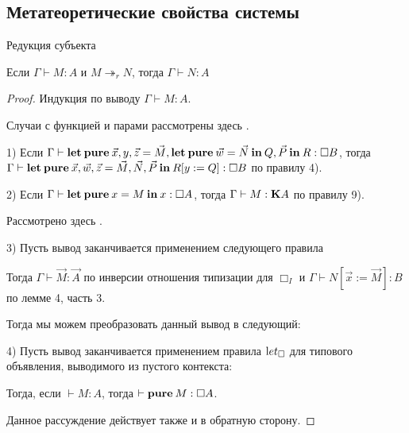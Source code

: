 \subsection{Метатеоретические свойства системы}

\begin{theorem} Редукция субъекта

Если $\Gamma \vdash M : A$ и $M \twoheadrightarrow_{r} N$, тогда $\Gamma \vdash N : A$

\end{theorem}

\begin{proof}

Индукция по выводу $\Gamma \vdash M : A$.

Случаи с функцией и парами рассмотрены здесь \cite{Morten} \cite{Pierce}.

1) Если $\Gamma \vdash {\bf let \: pure \:} \vec{x}, y, \vec{z} = \vec{M}, {\bf let \: pure \: } \vec{w} = \vec{N} {\bf \: in \: } Q, \vec{P}  {\: \bf in \:} R : \Box B$,
тогда $\Gamma \vdash {\bf let \: pure \:} \vec{x}, \vec{w}, \vec{z} = \vec{M}, \vec{N}, \vec{P} \: { \bf in } \: R [y := Q] : \Box B$ по правилу 4).

2) Если $\Gamma \vdash {\bf let \: pure \:} x = M {\: \bf in \: } x : \Box A$, тогда $\Gamma \vdash M : {\bf K}A$ по правилу 9).

Рассмотрено здесь \cite{ModalK}.

3) Пусть вывод заканчивается применением следующего правила

\begin{prooftree}
\end{prooftree}

Тогда $\Gamma \vdash \vec{M} : \vec{A}$ по инверсии отношения типизации для $\Box_I$ и $\Gamma \vdash N [\vec{x} := \vec{M}] : B$ по лемме 4, часть 3.

Тогда мы можем преобразовать данный вывод в следующий:

\begin{prooftree}
\end{prooftree}

4) Пусть вывод заканчивается применением правила ${\text let}_{\Box}$ для типового объявления, выводимого из пустого контекста:

\begin{prooftree}
\end{prooftree}

Тогда, если $\vdash M : A$, тогда $\vdash {\bf pure \:} M : \Box A$.

Данное рассуждение действует также и в обратную сторону.
\end{proof}

